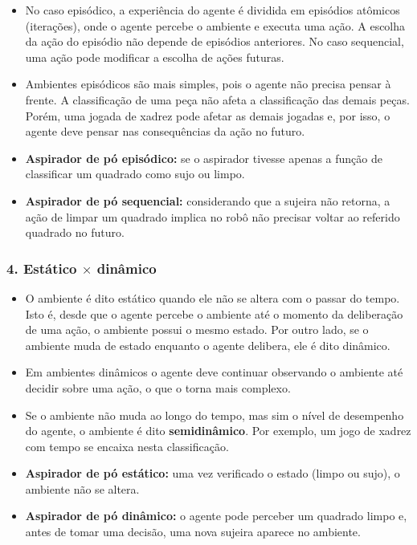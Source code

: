\begin{itemize}
	\item No caso episódico, a experiência do agente é dividida em episódios atômicos (iterações), onde o agente percebe o ambiente e executa uma ação. A escolha da ação do episódio não depende de episódios anteriores. No caso sequencial, uma ação pode modificar a escolha de ações futuras.
	
	\item Ambientes episódicos são mais simples, pois o agente não precisa pensar à frente. A classificação de uma peça não afeta a classificação das demais peças. Porém, uma jogada de xadrez pode afetar as demais jogadas e, por isso, o agente deve pensar nas consequências da ação no futuro.
	
	\item \textbf{Aspirador de pó episódico:} se o aspirador tivesse apenas a função de classificar um quadrado como sujo ou limpo.
	\item \textbf{Aspirador de pó sequencial:} considerando que a sujeira não retorna, a ação de limpar um quadrado implica no robô não precisar voltar ao referido quadrado no futuro.
\end{itemize}

\subsubsection{4. Estático $\times$ dinâmico}

\begin{itemize}
	\item O ambiente é dito estático quando ele não se altera com o passar do tempo. Isto é, desde que o agente percebe o ambiente até o momento da deliberação de uma ação, o ambiente possui o mesmo estado. Por outro lado, se o ambiente muda de estado enquanto o agente delibera, ele é dito dinâmico.
	
	\item Em ambientes dinâmicos o agente deve continuar observando o ambiente até decidir sobre uma ação, o que o torna mais complexo.
	
	\item Se o ambiente não muda ao longo do tempo, mas sim o nível de desempenho do agente, o ambiente é dito \textbf{semidinâmico}. Por exemplo, um jogo de xadrez com tempo se encaixa nesta classificação.
	
	\item \textbf{Aspirador de pó estático:} uma vez verificado o estado (limpo ou sujo), o ambiente não se altera.
	\item \textbf{Aspirador de pó dinâmico:} o agente pode perceber um quadrado limpo e, antes de tomar uma decisão, uma nova sujeira aparece no ambiente.
\end{itemize}

